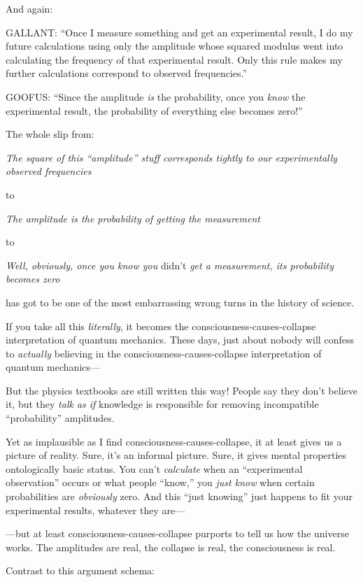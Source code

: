 {
 And again:}

{
 GALLANT: ``Once I measure something and get an
experimental result, I do my future calculations using only the
amplitude whose squared modulus went into calculating the frequency of
that experimental result. Only this rule makes my further calculations
correspond to observed frequencies.''}

{
 GOOFUS: ``Since the amplitude \textit{is} the
probability, once you \textit{know} the experimental result, the
probability of everything else becomes zero!''}

{
 The whole slip from:}

{
 \textit{The square of this
``amplitude'' stuff corresponds
tightly to our experimentally observed frequencies}}

{
 to}

{
 \textit{The amplitude is the probability of getting the
measurement}}

{
 to}

{
 \textit{Well, obviously, once you know you} didn't
\textit{get a measurement, its probability becomes zero}}

{
 has got to be one of the most embarrassing wrong turns in the
history of science.}

{
 If you take all this \textit{literally}, it becomes the
consciousness-causes-collapse interpretation of quantum mechanics.
These days, just about nobody will confess to \textit{actually}
believing in the consciousness-causes-collapse interpretation of
quantum mechanics---}

{
 But the physics textbooks are still written this way! People say
they don't believe it, but they \textit{talk as if}
knowledge is responsible for removing incompatible
``probability'' amplitudes.}

{
 Yet as implausible as I find consciousness-causes-collapse, it at
least gives us a picture of reality. Sure, it's an
informal picture. Sure, it gives mental properties ontologically basic
status. You can't \textit{calculate} when an
``experimental observation'' occurs
or what people ``know,'' you
\textit{just know} when certain probabilities are \textit{obviously}
zero. And this ``just knowing'' just
happens to fit your experimental results, whatever they are---}

{
 {}---but at least consciousness-causes-collapse purports to tell
us how the universe works. The amplitudes are real, the collapse is
real, the consciousness is real.}

{
 Contrast to this argument schema:}

